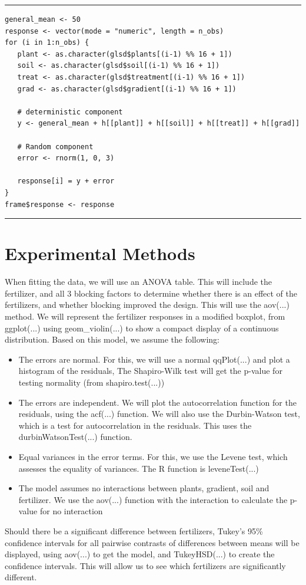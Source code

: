 \documentclass{article}
\begin{document}
\par\noindent\rule{\textwidth}{0.4pt}
\vspace{-25pt} %
\begin{verbatim}
general_mean <- 50
response <- vector(mode = "numeric", length = n_obs)
for (i in 1:n_obs) {
   plant <- as.character(glsd$plants[(i-1) %% 16 + 1])
   soil <- as.character(glsd$soil[(i-1) %% 16 + 1])
   treat <- as.character(glsd$treatment[(i-1) %% 16 + 1])
   grad <- as.character(glsd$gradient[(i-1) %% 16 + 1])

   # deterministic component
   y <- general_mean + h[[plant]] + h[[soil]] + h[[treat]] + h[[grad]]

   # Random component
   error <- rnorm(1, 0, 3)

   response[i] = y + error
} 
frame$response <- response
\end{verbatim}
\vspace{-15pt} %
\par\noindent\rule{\textwidth}{0.4pt}

\section{Experimental Methods}
When fitting the data, we will use an ANOVA table. This will include the fertilizer, and all 3 blocking factors to determine whether there is an effect of the fertilizers, and whether blocking improved the design. This will use the aov(...) method. We will represent the fertilizer responses in a modified boxplot, from ggplot(...) using geom\_violin(...) to show a compact display of a continuous distribution. Based on this model, we assume the following:
\begin{itemize}
    \item The errors are normal. For this, we will use a normal qqPlot(...) and plot a histogram of the residuals, The Shapiro-Wilk test will get the p-value for testing normality (from shapiro.test(...))
    \item The errors are independent. We will plot the autocorrelation function for the residuals, using the acf(...) function. We will also use the Durbin-Watson test, which is a test for autocorrelation in the residuals. This uses the durbinWatsonTest(...) function.
    \item Equal variances in the error terms. For this, we use the Levene test, which assesses the equality of variances. The R function is leveneTest(...)
    \item The model assumes no interactions between plants, gradient, soil and fertilizer. We use the aov(...) function with the interaction to calculate the p-value for no interaction
\end{itemize}
Should there be a significant difference between fertilizers, Tukey's 95\% confidence intervals for all pairwise contrasts of differences between means will be displayed, using aov(...) to get the model, and TukeyHSD(...) to create the confidence intervals. This will allow us to see which fertilizers are significantly different.
\end{document}
